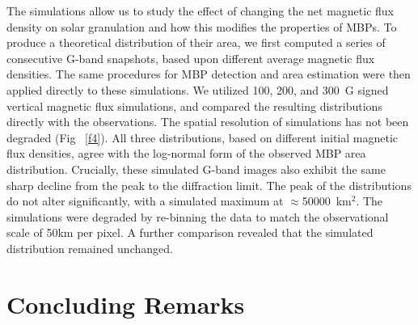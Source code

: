 \documentclass{emulateapj}
\begin{document}
The simulations allow us to study the effect of changing the net magnetic flux density on solar granulation and how this modifies the properties of MBPs. To produce a theoretical distribution of their area, we first computed a series of consecutive G-band snapshots, based upon different average magnetic flux densities. The same procedures for MBP detection and area estimation were then applied directly to these simulations. We utilized 100, 200, and 300~G signed vertical magnetic flux simulations, and compared the resulting distributions directly with the observations. The spatial resolution of simulations has not been degraded (Fig ~\ref{f4}). All three distributions, based on different initial magnetic flux densities, agree with the log-normal form of the observed MBP area distribution. Crucially, these simulated G-band images also exhibit the same sharp decline from the peak to the diffraction limit. The peak of the distributions do not alter significantly, with a simulated maximum at $\approx$50000~km$^{2}$.  The simulations were degraded by re-binning the data to match the observational scale of 50km per pixel.  A further comparison revealed that the simulated distribution remained unchanged.    


\section{Concluding Remarks}
\label{conc}
\end{document}
